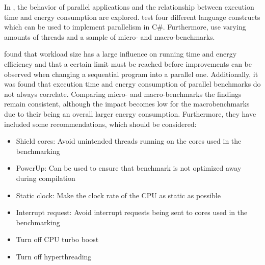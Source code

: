 


In \cite{Lindholt}, the behavior of parallel applications and the relationship between execution time and energy consumption are explored. \cite{Lindholt} test four different language constructs which can be used to implement parallelism in C\#. Furthermore, \cite{Lindholt} use varying amounts of threads and a sample of micro- and macro-benchmarks.\cite{Lindholt}

\cite{Lindholt} found that workload size has a large influence on running time and energy efficiency and that a certain limit must be reached before improvements can be observed when changing a sequential program into a parallel one. Additionally, it was found that execution time and energy consumption of parallel benchmarks do not always correlate. Comparing micro- and macro-benchmarks the findings remain consistent, although the impact becomes low for the macrobenchmarks due to their being an overall larger energy consumption. Furthermore, they have included some recommendations, which should be considered:\cite{Lindholt}

\begin{itemize}
    \item Shield cores: Avoid unintended threads running on the cores used in the benchmarking
    \item PowerUp: Can be used to ensure that benchmark is not optimized away during compilation
    \item Static clock: Make the clock rate of the CPU as static as possible
    \item Interrupt request: Avoid interrupt requests being sent to cores used in the benchmarking 
    \item Turn off CPU turbo boost
    \item Turn off hyperthreading
\end{itemize}